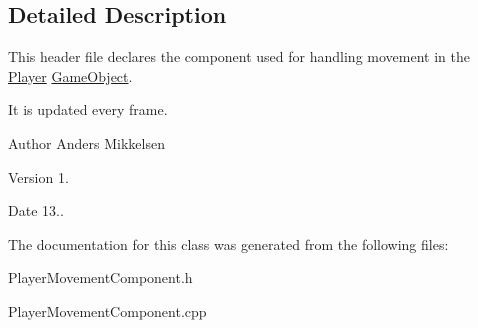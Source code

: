 \subsection{Detailed Description}
This header file declares the component used for handling movement in the \hyperlink{class_player}{Player} \hyperlink{class_game_object}{Game\+Object}. 

It is updated every frame.

\begin{DoxyAuthor}{Author}
Anders Mikkelsen 
\end{DoxyAuthor}
\begin{DoxyVersion}{Version}
1. 
\end{DoxyVersion}
\begin{DoxyDate}{Date}
13.. 
\end{DoxyDate}


The documentation for this class was generated from the following files\+:\begin{DoxyCompactItemize}
\item 
Player\+Movement\+Component.\+h\item 
Player\+Movement\+Component.\+cpp\end{DoxyCompactItemize}
